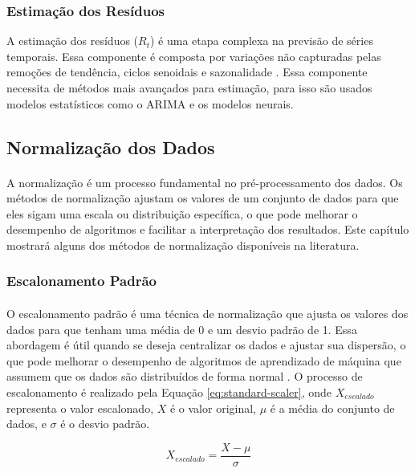 \subsubsection{Estimação dos Resíduos}
A estimação dos resíduos (\(R_t\)) é uma etapa complexa na previsão de séries temporais. Essa componente é composta por variações não capturadas pelas remoções de tendência, ciclos senoidais e sazonalidade \cite{Yasin23}. Essa componente necessita de métodos mais avançados para estimação, para isso são usados modelos estatísticos como o \ac{ARIMA} e os modelos neurais.

\subsection{Normalização dos Dados}
\paragraph{} A normalização é um processo fundamental no pré-processamento dos dados. Os métodos de normalização ajustam os valores de um conjunto de dados para que eles sigam uma escala ou distribuição específica, o que pode melhorar o desempenho de algoritmos e facilitar a interpretação dos resultados. Este capítulo mostrará alguns dos métodos de normalização disponíveis na literatura.

\subsubsection{Escalonamento Padrão}
\paragraph{} O escalonamento padrão é uma técnica de normalização que ajusta os valores dos dados para que tenham uma média de 0 e um desvio padrão de 1. Essa abordagem é útil quando se deseja centralizar os dados e ajustar sua dispersão, o que pode melhorar o desempenho de algoritmos de aprendizado de máquina que assumem que os dados são distribuídos de forma normal \cite{vasconcelos2024_distribuicao_normal}. O processo de escalonamento é realizado pela Equação \ref{eq:standard-scaler}, onde \(X_{escalado}\) representa o valor escalonado, \(X\) é o valor original, \(\mu\) é a média do conjunto de dados, e \(\sigma\) é o desvio padrão.

\begin{equation}
	X_{escalado} = \frac{X - \mu}{\sigma}
	\label{eq:standard-scaler}
\end{equation}

